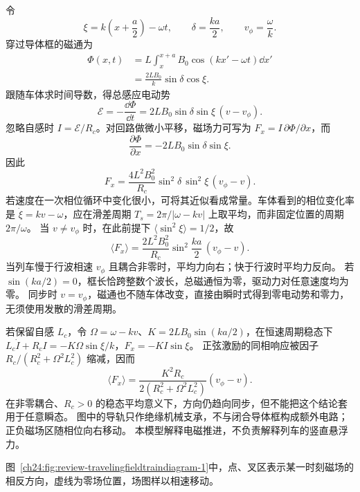 \begin{xesolution}
\par\noindent\begin{minipage}{\linewidth}
\travelingFieldTrainDiagram
{}\label{ch24:fig:review-travelingfieldtraindiagram-1}
\end{minipage}\par\medskip

令
\begin{equation}
  \xi=k\left(x+\frac a2\right)-\omega t,
  \qquad
  \delta=\frac{ka}{2},
  \qquad
  v_\phi=\frac\omega k.
\end{equation}
穿过导体框的磁通为
\begin{align}
  \Phi(x,t)
  &=L\int_x^{x+a}B_0\cos(kx'-\omega t)\dd x'\\
  &=\frac{2LB_0}{k}\sin\delta\cos\xi.
\end{align}
跟随车体求时间导数，得总感应电动势
\begin{equation}
  \mathcal E=-\frac{\dd\Phi}{\dd t}
  =2LB_0\sin\delta\sin\xi\,(v-v_\phi).
\end{equation}
忽略自感时 $I=\mathcal E/R_c$。对回路做微小平移，磁场力可写为 $F_x=I\,\partial\Phi/\partial x$，而
\begin{equation}
  \frac{\partial\Phi}{\partial x}=-2LB_0\sin\delta\sin\xi.
\end{equation}
因此
\begin{equation}
  \boxed{F_x=\frac{4L^2B_0^2}{R_c}\sin^2\!\delta\,\sin^2\!\xi\,(v_\phi-v)}.
\end{equation}
若速度在一次相位循环中变化很小，可将其近似看成常量。车体看到的相位变化率是
$\dot\xi=kv-\omega$，应在滑差周期 $T_s=2\pi/|\omega-kv|$ 上取平均，而非固定位置的周期 $2\pi/\omega$。
当 $v\ne v_\phi$ 时，在此前提下 $\langle\sin^2\xi\rangle=1/2$，故
\begin{equation}
  \boxed{\langle F_x\rangle=\frac{2L^2B_0^2}{R_c}
  \sin^2\!\frac{ka}{2}\,(v_\phi-v)}.
\end{equation}
当列车慢于行波相速 $v_\phi$ 且耦合非零时，平均力向右；快于行波时平均力反向。
若 $\sin(ka/2)=0$，框长恰跨整数个波长，总磁通恒为零，驱动力对任意速度均为零。
同步时 $v=v_\phi$，磁通也不随车体改变，直接由瞬时式得到零电动势和零力，无须使用发散的滑差周期。

若保留自感 $L_c$，令 $\Omega=\omega-kv$、$K=2LB_0\sin(ka/2)$，在恒速周期稳态下
$L_c\dot I+R_cI=-K\Omega\sin\xi/k$，$F_x=-KI\sin\xi$。
正弦激励的同相响应被因子 $R_c/(R_c^2+\Omega^2L_c^2)$ 缩减，因而
\[
 \langle F_x\rangle=
 \frac{K^2R_c}{2(R_c^2+\Omega^2L_c^2)}(v_\phi-v).
\]
在非零耦合、$R_c>0$ 的稳态平均意义下，方向仍趋向同步，但不能把这个结论套用于任意瞬态。
图中的导轨只作绝缘机械支承，不与闭合导体框构成额外电路；正负磁场区随相位向右移动。
本模型解释电磁推进，不负责解释列车的竖直悬浮力。

图~\ref{ch24:fig:review-travelingfieldtraindiagram-1}中，点、叉区表示某一时刻磁场的相反方向，虚线为零场位置，场图样以相速移动。

\end{xesolution}

